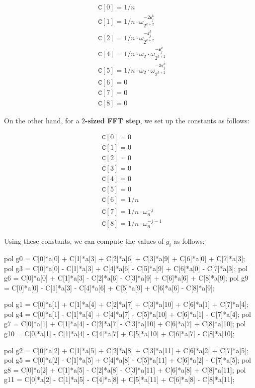 \begin{align*}
& \texttt{C}[0] = 1/n \\
& \texttt{C}[1] = 1/n \cdot \omega_{2^{k+2}}^{-2{\mathfrak{s}_j^k}} \\
& \texttt{C}[2] = 1/n \cdot \omega_{2^{k+2}}^{-{\mathfrak{s}_j^k}} \\
& \texttt{C}[4]  = 1/n \cdot \omega_2 \cdot \omega_{2^{k+2}}^{-{\mathfrak{s}_j^k}} \\
& \texttt{C}[5]  = 1/n \cdot \omega_2 \cdot \omega_{2^{k+2}}^{-3{\mathfrak{s}_j^k}} \\
& \texttt{C}[6]  = 0 \\
& \texttt{C}[7]  = 0 \\
& \texttt{C}[8]  = 0 
\end{align*}

On the other hand, for a \textbf{$2$-sized FFT step}, we set up the constants as follows:

\begin{align*}
& \texttt{C}[0] = 0 \\
& \texttt{C}[1] = 0 \\
& \texttt{C}[2] = 0 \\
& \texttt{C}[3] = 0 \\
& \texttt{C}[4]  = 0 \\
& \texttt{C}[5]  = 0 \\
& \texttt{C}[6]  = 1/n \\
& \texttt{C}[7]  = 1/n \cdot \omega_{n}^{-j} \\
& \texttt{C}[8]  = 1/n \cdot \omega_{n}^{-j-1}
\end{align*}

Using these constants, we can compute the values of $g_i$ as follows:

\begin{pil}
pol g0  = C[0]*a[0] + C[1]*a[3] + C[2]*a[6] + C[3]*a[9]  + C[6]*a[0] + C[7]*a[3];
pol g3  = C[0]*a[0] - C[1]*a[3] + C[4]*a[6] - C[5]*a[9]  + C[6]*a[0] - C[7]*a[3];
pol g6  = C[0]*a[0] + C[1]*a[3] - C[2]*a[6] - C[3]*a[9]  + C[6]*a[6] + C[8]*a[9];
pol g9  = C[0]*a[0] - C[1]*a[3] - C[4]*a[6] + C[5]*a[9]  + C[6]*a[6] - C[8]*a[9];

pol g1  = C[0]*a[1] + C[1]*a[4] + C[2]*a[7] + C[3]*a[10] + C[6]*a[1] + C[7]*a[4];
pol g4  = C[0]*a[1] - C[1]*a[4] + C[4]*a[7] - C[5]*a[10] + C[6]*a[1] - C[7]*a[4];
pol g7  = C[0]*a[1] + C[1]*a[4] - C[2]*a[7] - C[3]*a[10] + C[6]*a[7] + C[8]*a[10];
pol g10 = C[0]*a[1] - C[1]*a[4] - C[4]*a[7] + C[5]*a[10] + C[6]*a[7] - C[8]*a[10];

pol g2  = C[0]*a[2] + C[1]*a[5] + C[2]*a[8] + C[3]*a[11] + C[6]*a[2] + C[7]*a[5];
pol g5  = C[0]*a[2] - C[1]*a[5] + C[4]*a[8] - C[5]*a[11] + C[6]*a[2] - C[7]*a[5];
pol g8  = C[0]*a[2] + C[1]*a[5] - C[2]*a[8] - C[3]*a[11] + C[6]*a[8] + C[8]*a[11];
pol g11 = C[0]*a[2] - C[1]*a[5] - C[4]*a[8] + C[5]*a[11] + C[6]*a[8] - C[8]*a[11];
\end{pil}

